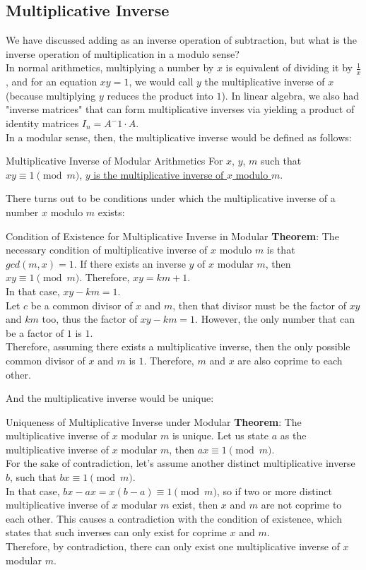 \subsection{Multiplicative Inverse}
We have discussed adding as an inverse operation of subtraction, but what is the inverse operation of multiplication in a modulo sense? \\
In normal arithmetics, multiplying a number by $x$ is equivalent of dividing it by $\frac{1}{x}$, and for an equation $xy = 1$, we would call $y$ the multiplicative inverse of $x$ (because multiplying $y$ reduces the product into $1$). In linear algebra, we also had "inverse matrices" that can form multiplicative inverses via yielding a product of identity matrices $I_n = A^-1 \cdot A$. \\
In a modular sense, then, the multiplicative inverse would be defined as follows: \\
\begin{ln-define}{Multiplicative Inverse of Modular Arithmetics}{}
    For $x$, $y$, $m$ such that $xy \equiv 1\pmod{m}$, \underline{$y$ is the multiplicative inverse of $x$ modulo $m$}.
\end{ln-define}
There turns out to be conditions under which the multiplicative inverse of a number $x$ modulo $m$ exists:
\begin{ln-theorem}{Condition of Existence for Multiplicative Inverse in Modular}{}
    \textbf{Theorem}: The necessary condition of multiplicative inverse of $x$ modulo $m$ is that $gcd(m, x) = 1$.
    \tcblower
    If there exists an inverse $y$ of $x$ modular $m$, then $xy \equiv 1\pmod{m}$. Therefore, $xy = km + 1$. \\
    In that case, $xy - km = 1$. \\
    Let $c$ be a common divisor of $x$ and $m$, then that divisor must be the factor of $xy$ and $km$ too, thus the factor of $xy - km = 1$. However, the only number that can be a factor of $1$ is $1$. \\
    Therefore, assuming there exists a multiplicative inverse, then the only possible common divisor of $x$ and $m$ is $1$. Therefore, $m$ and $x$ are also coprime to each other.
\end{ln-theorem}
And the multiplicative inverse would be unique:
\begin{ln-theorem}{Uniqueness of Multiplicative Inverse under Modular}{}
    \textbf{Theorem}: The multiplicative inverse of $x$ modular $m$ is unique.
    \tcblower
    Let us state $a$ as the multiplicative inverse of $x$ modular $m$, then $ax \equiv 1\pmod{m}$. \\
    For the sake of contradiction, let's assume another distinct multiplicative inverse $b$, such that $bx \equiv 1\pmod{m}$. \\
    In that case, $bx - ax = x(b - a) \equiv 1\pmod{m}$, so if two or more distinct multiplicative inverse of $x$ modular $m$ exist, then $x$ and $m$ are not coprime to each other. This causes a contradiction with the condition of existence, which states that such inverses can only exist for coprime $x$ and $m$. \\
    Therefore, by contradiction, there can only exist one multiplicative inverse of $x$ modular $m$.
\end{ln-theorem}

